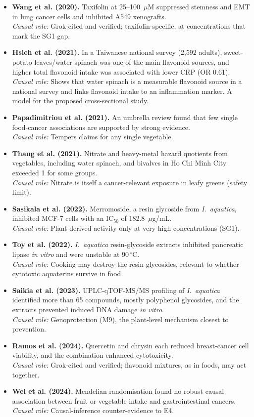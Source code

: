 \documentclass[11pt,a4paper]{article}
\newenvironment{litlist}{\begin{itemize}[leftmargin=2.6em,labelwidth=2.2em,labelsep=0.4em,align=left,itemsep=5pt,topsep=4pt]}{\end{itemize}}
\newcommand{\litentry}[4]{\item[\cite{#1}] \textbf{\color{navy}#2.} #3\\[1pt]
  {\color{teal}\textit{Causal role:}} #4}
\newcommand{\Ia}{\emph{I.~aquatica}}
\begin{document}
\begin{litlist}
\litentry{wang2020}{Wang et al. (2020)}{Taxifolin at 25--100~$\mu$M suppressed stemness and EMT in lung cancer cells and inhibited A549 xenografts.}{Grok-cited and verified; taxifolin-specific, at concentrations that mark the SG1 gap.}

\litentry{hsieh2021}{Hsieh et al. (2021)}{In a Taiwanese national survey (2{,}592 adults), sweet-potato leaves/water spinach was one of the main flavonoid sources, and higher total flavonoid intake was associated with lower CRP (OR 0.61).}{Shows that water spinach is a measurable flavonoid source in a national survey and links flavonoid intake to an inflammation marker. A model for the proposed cross-sectional study.}

\litentry{papadimitriou2021}{Papadimitriou et al. (2021)}{An umbrella review found that few single food-cancer associations are supported by strong evidence.}{Tempers claims for any single vegetable.}

\litentry{thang2021}{Thang et al. (2021)}{Nitrate and heavy-metal hazard quotients from vegetables, including water spinach, and bivalves in Ho Chi Minh City exceeded 1 for some groups.}{Nitrate is itself a cancer-relevant exposure in leafy greens (safety limit).}

\litentry{sasikala2022}{Sasikala et al. (2022)}{Merromoside, a resin glycoside from \Ia{}, inhibited MCF-7 cells with an IC$_{50}$ of 182.8~$\mu$g/mL.}{Plant-derived activity only at very high concentrations (SG1).}

\litentry{toy2022}{Toy et al. (2022)}{\Ia{} resin-glycoside extracts inhibited pancreatic lipase \emph{in vitro} and were unstable at 90\,$^\circ$C.}{Cooking may destroy the resin glycosides, relevant to whether cytotoxic aquaterins survive in food.}

\litentry{saikia2023}{Saikia et al. (2023)}{UPLC-qTOF-MS/MS profiling of \Ia{} identified more than 65 compounds, mostly polyphenol glycosides, and the extracts prevented induced DNA damage \emph{in vitro}.}{Genoprotection (M9), the plant-level mechanism closest to prevention.}

\litentry{ramos2024}{Ramos et al. (2024)}{Quercetin and chrysin each reduced breast-cancer cell viability, and the combination enhanced cytotoxicity.}{Grok-cited and verified; flavonoid mixtures, as in foods, may act together.}

\litentry{wei2024}{Wei et al. (2024)}{Mendelian randomisation found no robust causal association between fruit or vegetable intake and gastrointestinal cancers.}{Causal-inference counter-evidence to E4.}


\end{litlist}
\end{document}
